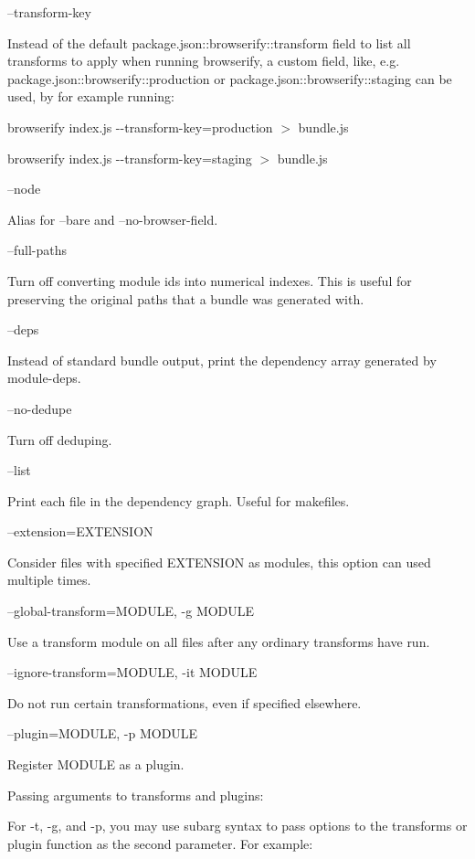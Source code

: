 --transform-\/key

Instead of the default package.\+json\+::browserify\+::transform field to list all transforms to apply when running browserify, a custom field, like, e.\+g. package.\+json\+::browserify\+::production or package.\+json\+::browserify\+::staging can be used, by for example running\+:
\begin{DoxyItemize}
\item {\ttfamily browserify index.\+js -\/-\/transform-\/key=production $>$ bundle.\+js}
\item {\ttfamily browserify index.\+js -\/-\/transform-\/key=staging $>$ bundle.\+js}
\end{DoxyItemize}

--node

Alias for --bare and --no-\/browser-\/field.

--full-\/paths

Turn off converting module ids into numerical indexes. This is useful for preserving the original paths that a bundle was generated with.

--deps

Instead of standard bundle output, print the dependency array generated by module-\/deps.

--no-\/dedupe

Turn off deduping.

--list

Print each file in the dependency graph. Useful for makefiles.

--extension=E\+X\+T\+E\+N\+S\+I\+ON

Consider files with specified E\+X\+T\+E\+N\+S\+I\+ON as modules, this option can used multiple times.

--global-\/transform=M\+O\+D\+U\+LE, -\/g M\+O\+D\+U\+LE

Use a transform module on all files after any ordinary transforms have run.

--ignore-\/transform=M\+O\+D\+U\+LE, -\/it M\+O\+D\+U\+LE

Do not run certain transformations, even if specified elsewhere.

--plugin=M\+O\+D\+U\+LE, -\/p M\+O\+D\+U\+LE

Register M\+O\+D\+U\+LE as a plugin.

Passing arguments to transforms and plugins\+:

For -\/t, -\/g, and -\/p, you may use subarg syntax to pass options to the transforms or plugin function as the second parameter. For example\+:


